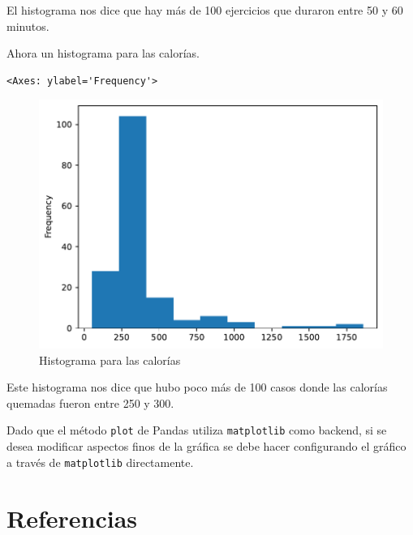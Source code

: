 El histograma nos dice que hay más de 100 ejercicios que duraron entre
50 y 60 minutos. \\

\begin{code} Ahora un histograma para las calorías.

\begin{Shaded}
\begin{Highlighting}[]
\NormalTok{df[}\NormalTok{].plot(kind }\OperatorTok{=} \NormalTok{)}
\end{Highlighting}
\end{Shaded}

\begin{verbatim}
<Axes: ylabel='Frequency'>
\end{verbatim}

\begin{figure}
  \centering
  \includegraphics[scale=0.75]{img/grafica905.pdf}
  \caption{Histograma para las calorías}
\end{figure}
\end{code}

Este histograma nos dice que hubo poco más de 100 casos donde las
calorías quemadas fueron entre 250 y 300.

Dado que el método \texttt{plot} de Pandas utiliza \texttt{matplotlib}
como backend, si se desea modificar aspectos finos de la gráfica se debe
hacer configurando el gráfico a través de \texttt{matplotlib}
directamente.

\section{Referencias}

